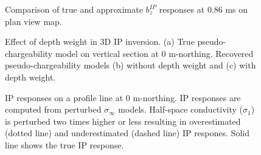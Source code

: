 \documentclass[extra,mreferee]{gji}
\newcommand{\siginf}{\sigma_\infty}
\begin{document}
\begin{figure}
  \caption{Comparison of true and approximate $b_z^{IP}$ responses at 0.86 ms on plan view map. }
  \label{F:EquivPeta_True_Approx}
\end{figure}

\begin{figure}
  \caption{Effect of depth weight in 3D IP inversion. (a) True pseudo-chargeability model on vertical section at 0 m-northing. Recovered pseudo-chargeability models (b) without depth weight and (c) with depth weight.}
  \label{F:Depthweight}
\end{figure}

\begin{figure}
  \caption{IP responses on a profile line at 0 m-northing.  IP responses are computed from perturbed $\siginf$ models. Half-space conductivity ($\sigma_1$) is perturbed two times higher or less resulting in overestimated (dotted line) and underestimated (dashed line) IP respones. Solid line shows the true IP response. }
  \label{F:Reg_IPresp}
\end{figure}
\end{document}
